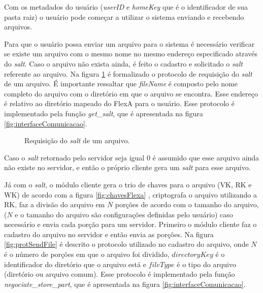         Com os metadados do usuário (\textit{userID} e \textit{homeKey} que é o identificador de sua pasta raiz) o usuário pode começar a utilizar o sistema enviando e recebendo arquivos.
        
        Para que o usuário possa enviar um arquivo para o sistema é necessário verificar se existe um arquivo com o mesmo nome no mesmo endereço especificado através do \textit{salt}. Caso o arquivo não exista ainda, é feito o cadastro e solicitado o \textit{salt} referente ao arquivo. Na figura \ref{fig:protGetSalt} é formalizado o protocolo de requisição do \textit{salt} de um arquivo. É importante ressaltar que \textit{fileName} é composto pelo nome completo do arquivo com o diretório em que o arquivo se encontra. Esse endereço é relativo ao diretório mapeado do FlexA para o usuário. Esse protocolo é implementado pela função \textit{get\_salt}, que é apresentada na figura \ref{fig:interfaceComunicacao}.

        \begin{figure}[!ht]
        \caption{Requisição do \textit{salt} de um arquivo.}
        \label{fig:protGetSalt}
        \end{figure}
        
        Caso o \textit{salt} retornado pelo servidor seja igual $0$ é assumido que esse arquivo ainda não existe no servidor, e então o próprio cliente gera um \textit{salt} para esse arquivo.
        
        Já com o \textit{salt}, o módulo cliente gera o trio de chaves para o arquivo (VK, RK e WK) de acordo com a figura \ref{fig:chavesFlexa} , criptografa o arquivo utilizando a RK, faz a divisão do arquivo em $N$ porções de acordo com o tamanho do arquivo, ($N$ e o tamanho do arquivo são configurações definidas pelo usuário) caso necessário e envia cada porção para um servidor. Primeiro o módulo cliente faz o cadastro do arquivo no servidor e então envia as porções. Na figura \ref{fig:protSendFile} é descrito o protocolo utilizado no cadastro do arquivo, onde $N$ é o número de porções em que o arquivo foi dividido, $directoryKey$ é o identificador do diretório que o arquivo está e $fileType$ é o tipo do arquivo (diretório ou arquivo comum). Esse protocolo é implementado pela função \textit{negociate\_store\_part}, que é apresentada na figura \ref{fig:interfaceComunicacao}.
        
